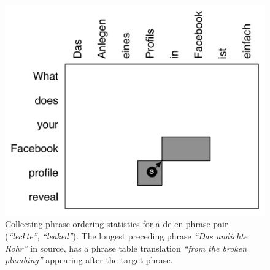 \documentclass[11pt]{article}
\newcommand{\emq}[1]{\emph{``#1''}}
\begin{document}
\begin{figure}[t]
\begin{center}
\includegraphics[width=0.8 \linewidth]{../figures/monoreord/monoreord.pdf}
\caption{Collecting phrase ordering statistics for a de-en phrase pair (\emq{leckte}, \emq{leaked}).  The longest preceding phrase \emq{Das undichte Rohr} in source, has a phrase table translation \emq{from the broken plumbing} appearing after the target phrase.}
\label{fig:monoreord}
\end{center}
\vskip -0.2in
\end{figure}

\end{document}
